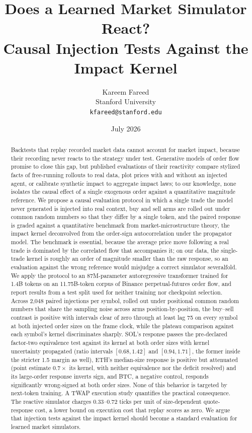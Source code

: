 \documentclass[11pt]{article}
\title{Does a Learned Market Simulator React?\\
\large Causal Injection Tests Against the Impact Kernel}
\author{Kareem Fareed\\
Stanford University\\
\texttt{kfareed@stanford.edu}}
\date{July 2026}
\begin{document}
\maketitle

\begin{abstract}
Backtests that replay recorded market data cannot account for market impact, because their recording never reacts to the strategy under test. 
Generative models of order flow promise to close this gap, but published evaluations of their reactivity compare stylized facts of free-running rollouts to real data, plot prices with and without an injected agent, or calibrate synthetic impact to aggregate impact laws; to our knowledge, none isolates the causal effect of a single exogenous order against a quantitative magnitude reference. We propose a causal evaluation protocol in which a single trade the model never generated is injected into real context, buy and sell arms are rolled out under common random numbers so that they differ by a single token, and the paired response is graded against a quantitative benchmark from market-microstructure theory, the impact kernel deconvolved from the order-sign autocorrelation under the propagator model. The benchmark is essential, because the average price move following a real trade is dominated by the correlated flow that accompanies it; on our data, the single-trade kernel is roughly an order of magnitude smaller than the raw response, so an evaluation against the wrong reference would misjudge a correct simulator severalfold. We apply the protocol to an 87M-parameter autoregressive transformer trained for 1.4B tokens on an 11.75B-token corpus of Binance perpetual-futures order flow, and report results from a test split used for neither training nor checkpoint selection. Across 2{,}048 paired injections per symbol, rolled out under positional common random numbers that share the sampling noise across arms position-by-position, the buy--sell contrast is positive with intervals clear of zero through at least lag 75 on every symbol at both injected order sizes on the frame clock, while the plateau comparison against each symbol's kernel discriminates sharply. SOL's response passes the pre-declared factor-two equivalence test against its kernel at both order sizes with kernel uncertainty propagated (ratio intervals $[0.68, 1.42]$ and $[0.94, 1.71]$, the former inside the stricter 1.5 margin as well), ETH's median-size response is positive but attenuated (point estimate $0.7\times$ its kernel, with neither equivalence nor the deficit resolved) and its large-order response inverts sign, and BTC, a negative control, responds significantly wrong-signed at both order sizes. None of this behavior is targeted by next-token training. A TWAP execution study quantifies the practical consequence. The reactive simulator charges 0.33--0.72 ticks per unit of size-dependent quote-response cost, a lower bound on execution cost that replay scores as zero. We argue that injection tests against the impact kernel should become a standard evaluation for learned market simulators.
\end{abstract}
\end{document}
